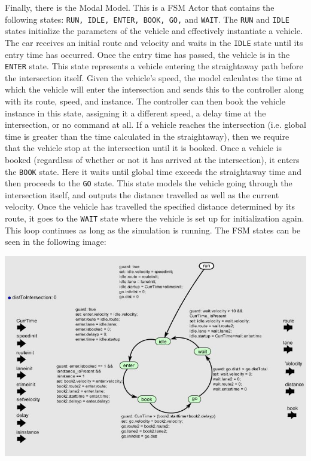 Finally, there is the Modal Model.  This is a FSM Actor that contains the following states: \texttt{RUN, IDLE, ENTER, BOOK, GO,} and \texttt{WAIT}.  The \texttt{RUN} and \texttt{IDLE} states initialize the parameters of the vehicle and effectively instantiate a vehicle.  The car receives an initial route and velocity and waits in the \texttt{IDLE} state until its entry time has occurred.  Once the entry time has passed, the vehicle is in the \texttt{ENTER} state.  This state represents a vehicle entering the straightaway path before the intersection itself.  Given the vehicle's speed, the model calculates the time at which the vehicle will enter the intersection and sends this to the controller along with its route, speed, and instance.  The controller can then book the vehicle instance in this state, assigning it a different speed, a delay time at the intersection, or no command at all.  If a vehicle reaches the intersection (i.e. global time is greater than the time calculated in the straightaway), then we require that the vehicle stop at the intersection until it is booked.  Once a vehicle is booked (regardless of whether or not it has arrived at the intersection), it enters the \texttt{BOOK} state.  Here it waits until global time exceeds the straightaway time and then proceeds to the \texttt{GO} state.  This state models the vehicle going through the intersection itself, and outputs the distance travelled as well as the current velocity.  Once the vehicle has travelled the specified distance determined by its route, it goes to the \texttt{WAIT} state where the vehicle is set up for initialization again.  This loop continues as long as the simulation is running.  The FSM states can be seen in the following image:
\begin{center}
\includegraphics[width=0.65\linewidth]{diagram/ptolemy_vehicle_fsm.jpg}
\end{center}

